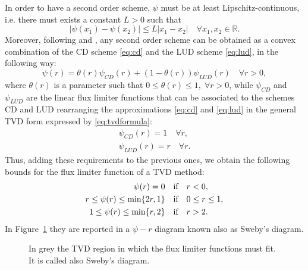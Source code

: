 In order to have a second order scheme, $\psi$ must be at least 
Lipschitz-continuous, i.e. there must exists a constant $L>0$ such that
\begin{equation}
	|\psi(x_1) - \psi (x_2)| \leq L | x_1 - x_2 | \quad \forall x_1, x_2 \in \mathbb{R}.
\end{equation}
Moreover, following \cite{tvd:sweeby} and 
\cite{tvd:vanleer}, any second order scheme 
can be obtained as a convex combination of the CD scheme \eqref{eq:cd} and the 
LUD scheme \eqref{eq:lud}, in the following way:
\begin{equation}
	\psi(r) = \theta(r) \psi_{CD}(r) + (1-\theta(r))\psi_{LUD}(r) \quad \forall 
	r >0,
\end{equation}
where $\theta(r)$ is a parameter such that $0 \leq \theta(r) \leq 1,\; \forall 
r>0$, while $\psi_{CD}$ and $\psi_{LUD}$ are the linear flux limiter functions 
that can be associated to the schemes CD and LUD rearranging the 
approximations \eqref{eq:cd} and \eqref{eq:lud} in the general TVD form expressed by \eqref{eq:tvdformula}:
\begin{gather}
	\psi_{CD}(r) = 1 \quad \forall r,\\
	\psi_{LUD}(r) = r \quad \forall r.
\end{gather}
Thus, adding these requirements to the previous ones, we 
obtain the following bounds for the flux limiter function of a TVD method:
\begin{align}
\psi(r) = 0 \quad &\text{if} \quad r < 0, \notag \\
\label{eq:tvdbounds} r \leq \psi(r) \leq \min \{2r, 1\} \quad &\text{if} \quad 
0 
\leq r \leq 1,\\
1 \leq \psi(r) \leq \min \{r, 2 \} \quad &\text{if} \quad r > 2. \notag
\end{align}
In Figure~\ref{fig:tvdregion} they are reported in a $\psi-r$ diagram known 
also as Sweby's diagram.
\begin{figure}
	\centering
	
	\caption[TVD region (Sweby's diagram)]{In grey the TVD region in which 
	the flux 
	limiter functions must fit. It is called also Sweby's diagram.}
	\label{fig:tvdregion}
\end{figure}
